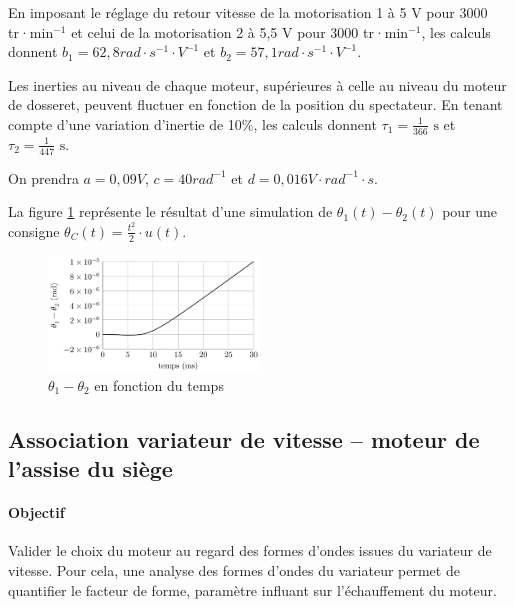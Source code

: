 En imposant le réglage du retour vitesse de la motorisation 1 à 5 V pour 3000 tr·min$^{-1}$ et celui de la motorisation 2 à 5,5 V pour 3000 tr·min$^{-1}$, les calculs donnent $b_1 = 62,8 rad\cdot s^{-1}\cdot V^{-1}$ et $b_2 = 57,1 rad\cdot s^{-1}\cdot V^{-1}$.

Les inerties au niveau de chaque moteur, supérieures à celle au niveau du moteur de dosseret, peuvent fluctuer en fonction de la position du spectateur. En tenant compte d'une variation d'inertie de 10\%, les calculs donnent $\tau_1 = \frac{1}{366} \text{ s}$ et $\tau_2 = \frac{1}{447} \text{ s}$.

On prendra $a = 0,09 V$, $c = 40 rad^{-1}$ et $d = 0,016 V\cdot rad^{-1}\cdot s$.


La figure \ref{fig20} représente le résultat d'une simulation de $\theta_1(t) - \theta_2(t)$ pour une consigne $\theta_{C}(t) = \frac{t^2}{2}\cdot u(t)$.

\begin{figure}[H]
\centering
\includegraphics[width=0.5\textwidth]{img/img20}
\caption{\label{fig20}$\theta_1 - \theta_2$ en fonction du temps}
\end{figure}


\subsection{Association variateur de vitesse – moteur de l'assise du siège}

\paragraph{Objectif}
Valider le choix du moteur au regard des formes d'ondes issues du variateur de vitesse. Pour cela, une analyse des formes d'ondes du variateur permet de quantifier le facteur de forme, paramètre influant sur l'échauffement du moteur.

